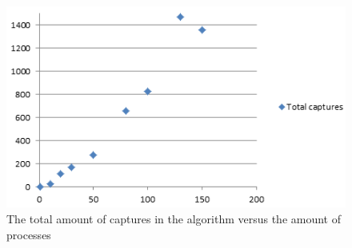 \documentclass[12pt]{article}
\begin{document}
\begin{figure}[p]
    \centering
    \includegraphics{totalcapture.png}
    \caption{The total amount of captures in the algorithm versus the amount of processes}
    \label{fig:captures}
\end{figure}
\end{document}
